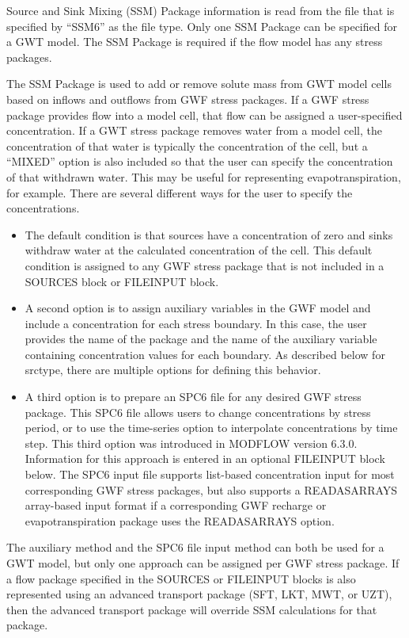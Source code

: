Source and Sink Mixing (SSM) Package information is read from the file that is specified by ``SSM6'' as the file type.  Only one SSM Package can be specified for a GWT model.  The SSM Package is required if the flow model has any stress packages.

The SSM Package is used to add or remove solute mass from GWT model cells based on inflows and outflows from GWF stress packages.  If a GWF stress package provides flow into a model cell, that flow can be assigned a user-specified concentration.  If a GWT stress package removes water from a model cell, the concentration of that water is typically the concentration of the cell, but a ``MIXED'' option is also included so that the user can specify the concentration of that withdrawn water.  This may be useful for representing evapotranspiration, for example.  There are several different ways for the user to specify the concentrations.  

\begin{itemize}
\item The default condition is that sources have a concentration of zero and sinks withdraw water at the calculated concentration of the cell.  This default condition is assigned to any GWF stress package that is not included in a SOURCES block or FILEINPUT block.
\item A second option is to assign auxiliary variables in the GWF model and include a concentration for each stress boundary.  In this case, the user provides the name of the package and the name of the auxiliary variable containing concentration values for each boundary.  As described below for srctype, there are multiple options for defining this behavior.
\item A third option is to prepare an SPC6 file for any desired GWF stress package.  This SPC6 file allows users to change concentrations by stress period, or to use the time-series option to interpolate concentrations by time step.  This third option was introduced in MODFLOW version 6.3.0.  Information for this approach is entered in an optional FILEINPUT block below.  The SPC6 input file supports list-based concentration input for most corresponding GWF stress packages, but also supports a READASARRAYS array-based input format if a corresponding GWF recharge or evapotranspiration package uses the READASARRAYS option.
\end{itemize}

\noindent The auxiliary method and the SPC6 file input method can both be used for a GWT model, but only one approach can be assigned per GWF stress package.   If a flow package specified in the SOURCES or FILEINPUT blocks is also represented using an advanced transport package (SFT, LKT, MWT, or UZT), then the advanced transport package will override SSM calculations for that package.

